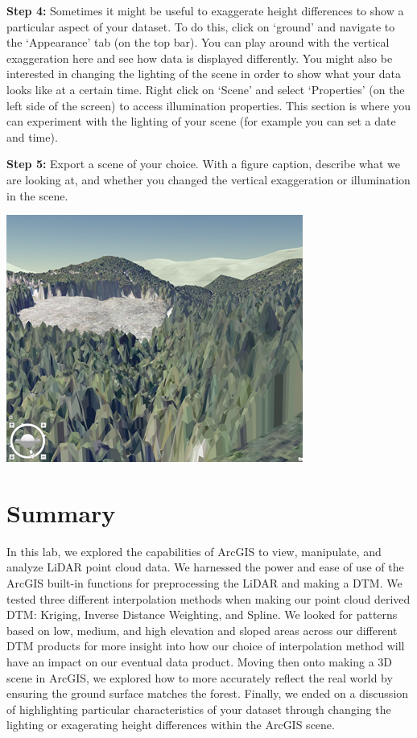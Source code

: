 \documentclass[
]{book}
\begin{document}
\textbf{Step 4:} Sometimes it might be useful to exaggerate height differences to show a particular aspect of your dataset. To do this, click on `ground' and navigate to the `Appearance' tab (on the top bar). You can play around with the vertical exaggeration here and see how data is displayed differently. You might also be interested in changing the lighting of the scene in order to show what your data looks like at a certain time. Right click on `Scene' and select `Properties' (on the left side of the screen) to access illumination properties. This section is where you can experiment with the lighting of your scene (for example you can set a date and time).

\textbf{Step 5:} Export a scene of your choice. With a figure caption, describe what we are looking at, and whether you changed the vertical exaggeration or illumination in the scene.

\begin{center}\includegraphics[width=0.75\linewidth]{images/04-example-scene-MKRF} \end{center}

\hypertarget{summary-2}{%
\section*{Summary}\label{summary-2}}

In this lab, we explored the capabilities of ArcGIS to view, manipulate, and analyze LiDAR point cloud data. We harnessed the power and ease of use of the ArcGIS built-in functions for preprocessing the LiDAR and making a DTM. We tested three different interpolation methods when making our point cloud derived DTM: Kriging, Inverse Distance Weighting, and Spline. We looked for patterns based on low, medium, and high elevation and sloped areas across our different DTM products for more insight into how our choice of interpolation method will have an impact on our eventual data product. Moving then onto making a 3D scene in ArcGIS, we explored how to more accurately reflect the real world by ensuring the ground surface matches the forest. Finally, we ended on a discussion of highlighting particular characteristics of your dataset through changing the lighting or exagerating height differences within the ArcGIS scene.
\end{document}
